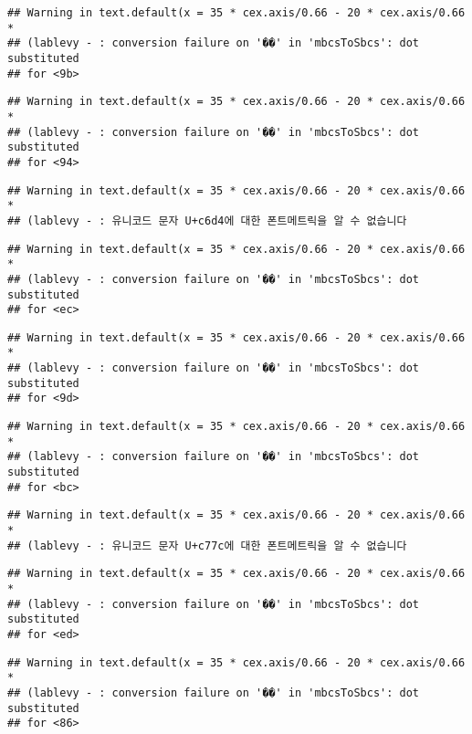 \documentclass[]{article}
\begin{document}
\begin{verbatim}
## Warning in text.default(x = 35 * cex.axis/0.66 - 20 * cex.axis/0.66 *
## (lablevy - : conversion failure on '��' in 'mbcsToSbcs': dot substituted
## for <9b>
\end{verbatim}

\begin{verbatim}
## Warning in text.default(x = 35 * cex.axis/0.66 - 20 * cex.axis/0.66 *
## (lablevy - : conversion failure on '��' in 'mbcsToSbcs': dot substituted
## for <94>
\end{verbatim}

\begin{verbatim}
## Warning in text.default(x = 35 * cex.axis/0.66 - 20 * cex.axis/0.66 *
## (lablevy - : 유니코드 문자 U+c6d4에 대한 폰트메트릭을 알 수 없습니다
\end{verbatim}

\begin{verbatim}
## Warning in text.default(x = 35 * cex.axis/0.66 - 20 * cex.axis/0.66 *
## (lablevy - : conversion failure on '��' in 'mbcsToSbcs': dot substituted
## for <ec>
\end{verbatim}

\begin{verbatim}
## Warning in text.default(x = 35 * cex.axis/0.66 - 20 * cex.axis/0.66 *
## (lablevy - : conversion failure on '��' in 'mbcsToSbcs': dot substituted
## for <9d>
\end{verbatim}

\begin{verbatim}
## Warning in text.default(x = 35 * cex.axis/0.66 - 20 * cex.axis/0.66 *
## (lablevy - : conversion failure on '��' in 'mbcsToSbcs': dot substituted
## for <bc>
\end{verbatim}

\begin{verbatim}
## Warning in text.default(x = 35 * cex.axis/0.66 - 20 * cex.axis/0.66 *
## (lablevy - : 유니코드 문자 U+c77c에 대한 폰트메트릭을 알 수 없습니다
\end{verbatim}

\begin{verbatim}
## Warning in text.default(x = 35 * cex.axis/0.66 - 20 * cex.axis/0.66 *
## (lablevy - : conversion failure on '��' in 'mbcsToSbcs': dot substituted
## for <ed>
\end{verbatim}

\begin{verbatim}
## Warning in text.default(x = 35 * cex.axis/0.66 - 20 * cex.axis/0.66 *
## (lablevy - : conversion failure on '��' in 'mbcsToSbcs': dot substituted
## for <86>
\end{verbatim}
\end{document}
